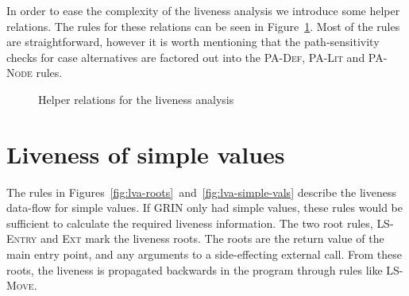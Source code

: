\documentclass[main.tex]{subfiles}
\begin{document}
	In order to ease the complexity of the liveness analysis we introduce some helper relations. The rules for these relations can be seen in Figure~\ref{fig:lva-helpers}. Most of the rules are straightforward, however it is worth mentioning that the path-sensitivity checks for case alternatives are factored out into the \textsc{PA-Def}, \textsc{PA-Lit} and \textsc{PA-Node} rules.

  \begin{figure}[h]

  \caption{Helper relations for the liveness analysis}
  \label{fig:lva-helpers}
  \end{figure}

	\section{Liveness of simple values}
	
	The rules in Figures~\ref{fig:lva-roots}~and~\ref{fig:lva-simple-vals} describe the liveness data-flow for simple values. If GRIN only had simple values, these rules would be sufficient to calculate the required liveness information. The two root rules, \textsc{LS-Entry} and \textsc{Ext} mark the liveness roots. The roots are the return value of the main entry point, and any arguments to a side-effecting external call. From these roots, the liveness is propagated backwards in the program through rules like \textsc{LS-Move}.
\end{document}
